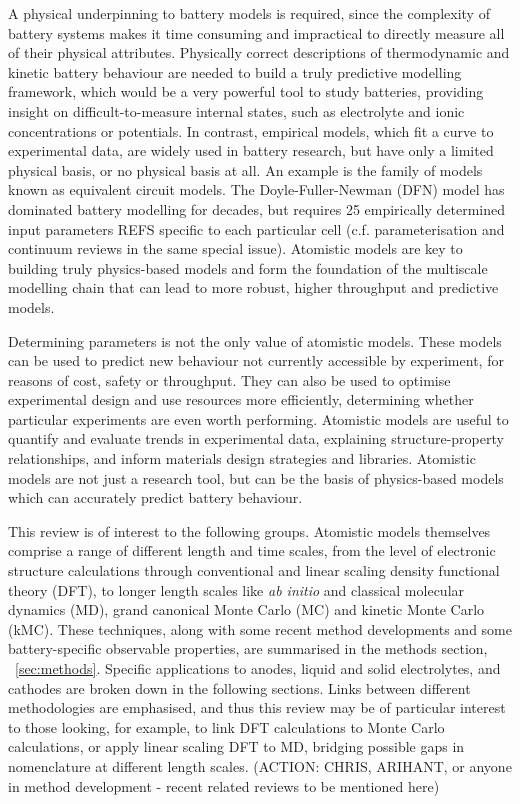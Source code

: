 \documentclass[../main.tex]{subfiles}
\begin{document}
A physical underpinning to battery models is required, since the complexity of battery systems makes it time consuming and impractical to directly measure all of their physical attributes. Physically correct descriptions of thermodynamic and kinetic battery behaviour are needed to build a truly predictive modelling framework, which would be a very powerful tool to study batteries, providing insight on difficult-to-measure internal states, such as electrolyte and ionic concentrations or potentials. In contrast, empirical models, which fit a curve to experimental data, are widely used in battery research, but have only a limited physical basis, or no physical basis at all. An example is the family of models known as equivalent circuit models. The Doyle-Fuller-Newman (DFN) model \cite{Newman1975} has dominated battery modelling for decades, but  requires 25 empirically determined input parameters REFS specific to each particular cell (c.f. parameterisation and continuum reviews in the same special issue). Atomistic models are key to building truly physics-based models and form the foundation of the multiscale modelling chain that can lead to more robust, higher throughput and predictive models.
 
Determining parameters is not the only value of atomistic models. These models can be used to predict new behaviour not currently accessible by experiment, for reasons of cost, safety or throughput. They can also be used to optimise experimental design and use resources more efficiently, determining whether particular experiments are even worth performing. Atomistic models are useful to quantify and evaluate trends in experimental data, explaining structure-property relationships, and inform materials design strategies and libraries. Atomistic models are not just a research tool, but can be the basis of physics-based models which can accurately predict battery behaviour.

This review is of interest to the following groups. Atomistic models themselves comprise a range of different length and time scales, from the level of electronic structure calculations through conventional and linear scaling density functional theory (DFT), to longer length scales like \textit{ab initio} and classical molecular dynamics (MD), grand canonical Monte Carlo (MC) and kinetic Monte Carlo (kMC). These techniques, along with some recent method developments and some battery-specific observable properties, are summarised in the methods section, ~\ref{sec:methods}. Specific applications to anodes, liquid and solid electrolytes, and cathodes are broken down in the following sections. Links between different methodologies are emphasised, and thus this review may be of particular interest to those looking, for example, to link DFT calculations to Monte Carlo calculations, or apply linear scaling DFT to MD, bridging possible gaps in nomenclature at different length scales. (ACTION: CHRIS, ARIHANT, or anyone in method development - recent related reviews to be mentioned here)
\end{document}
